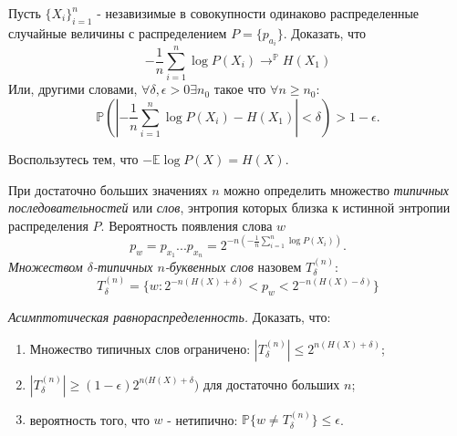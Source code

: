 \begin{problem}
Пусть $\{X_i\}_{i=1}^n$ - незавизимые в совокупности одинаково распределенные случайные величины с распределением $P = \{p_{a_i}\}$. Доказать, что 
\begin{equation}
-\frac{1}{n} \sum_{i = 1}^n \log P(X_i) \rightarrow^{\mathbb{P}} H(X_1)
\end{equation}
Или, другими словами, $\forall \delta, \epsilon > 0 \exists n_0$ такое что $\forall n \geq n_0$:
\begin{equation}
\mathbb{P}(|-\frac{1}{n} \sum_{i = 1}^n \log P(X_i) - H(X_1)| < \delta) > 1-\epsilon.
\end{equation}

\begin{ordre}
Воспользутесь тем, что $-\mathbb{E} \log P(X) = H(X)$.
\end{ordre}
\end{problem}

\begin{remark} При достаточно больших значениях $n$ можно определить множество \textit{типичных последовательностей} или \textit{слов}, энтропия которых близка к истинной энтропии распределения $P$. Вероятность появления слова $w$
\begin{equation}
p_w = p_{x_1}...p_{x_n} = 2^{-n (-\frac{1}{n} \sum_{i = 1}^n \log P(X_i))}.
\end{equation}
\textit{Множеством $\delta$-типичных $n$-буквенных слов} назовем $T_{\delta}^{(n)}$:
\begin{equation}
T_{\delta}^{(n)} = \{w: 2^{-n(H(X) + \delta)} < p_w < 2^{-n(H(X) - \delta)} \}
\end{equation}
\end{remark}

\begin{problem} \textit{Асимптотическая равнораспределенность.}
Доказать, что:
\begin{enumerate}
\item Множество типичных слов ограничено: $|T_{\delta}^{(n)}| \leq 2^{n(H(X) + \delta)}$;
\item $|T_{\delta}^{(n)}| \geq (1-\epsilon)2^{n(H(X) + \delta})$ для достаточно больших $n$;
\item вероятность того, что $w$ - нетипично: $\mathbb{P}\{w \neq T_{\delta}^{(n)} \} \leq \epsilon$.
\end{enumerate}
\end{problem}


